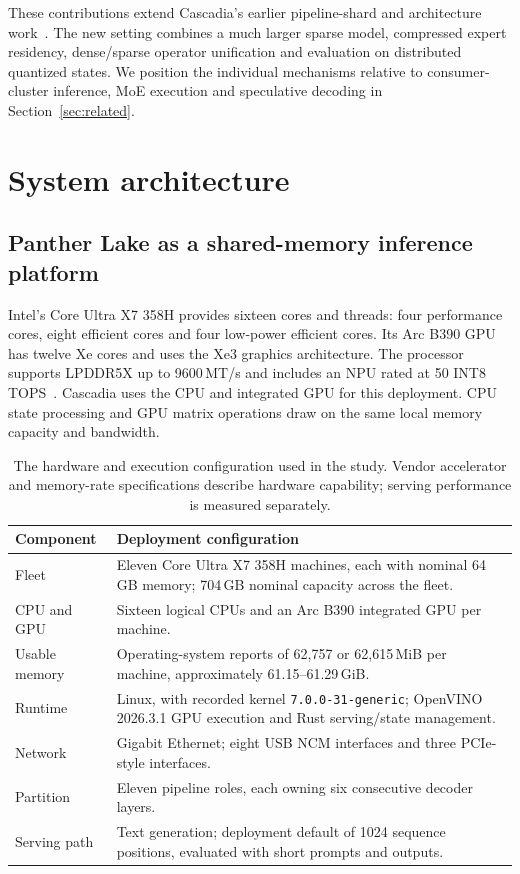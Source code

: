 \documentclass[11pt]{article}
\begin{document}
These contributions extend Cascadia's earlier pipeline-shard and architecture work~\cite{shards,architecture}. The new setting combines a much larger sparse model, compressed expert residency, dense/sparse operator unification and evaluation on distributed quantized states. We position the individual mechanisms relative to consumer-cluster inference, MoE execution and speculative decoding in Section~\ref{sec:related}.

\section{System architecture}
\label{sec:architecture}

\subsection{Panther Lake as a shared-memory inference platform}
Intel's Core Ultra X7 358H provides sixteen cores and threads: four performance cores, eight efficient cores and four low-power efficient cores. Its Arc B390 GPU has twelve Xe cores and uses the Xe3 graphics architecture. The processor supports LPDDR5X up to 9600\,MT/s and includes an NPU rated at 50 INT8 TOPS~\cite{intel358h,intelxe3}. Cascadia uses the CPU and integrated GPU for this deployment. CPU state processing and GPU matrix operations draw on the same local memory capacity and bandwidth.

\begin{table}[ht]
\centering\small
\begin{tabularx}{\linewidth}{lX}
\toprule
Component & Deployment configuration\\
\midrule
Fleet & Eleven Core Ultra X7 358H machines, each with nominal 64\,GB memory; 704\,GB nominal capacity across the fleet.\\
CPU and GPU & Sixteen logical CPUs and an Arc B390 integrated GPU per machine.\\
Usable memory & Operating-system reports of 62,757 or 62,615\,MiB per machine, approximately 61.15--61.29\,GiB.\\
Runtime & Linux, with recorded kernel \texttt{7.0.0-31-generic}; OpenVINO 2026.3.1 GPU execution and Rust serving/state management.\\
Network & Gigabit Ethernet; eight USB NCM interfaces and three PCIe-style interfaces.\\
Partition & Eleven pipeline roles, each owning six consecutive decoder layers.\\
Serving path & Text generation; deployment default of 1024 sequence positions, evaluated with short prompts and outputs.\\
\bottomrule
\end{tabularx}
\caption{The hardware and execution configuration used in the study. Vendor accelerator and memory-rate specifications describe hardware capability; serving performance is measured separately.}
\label{tab:hardware}
\end{table}
\end{document}
